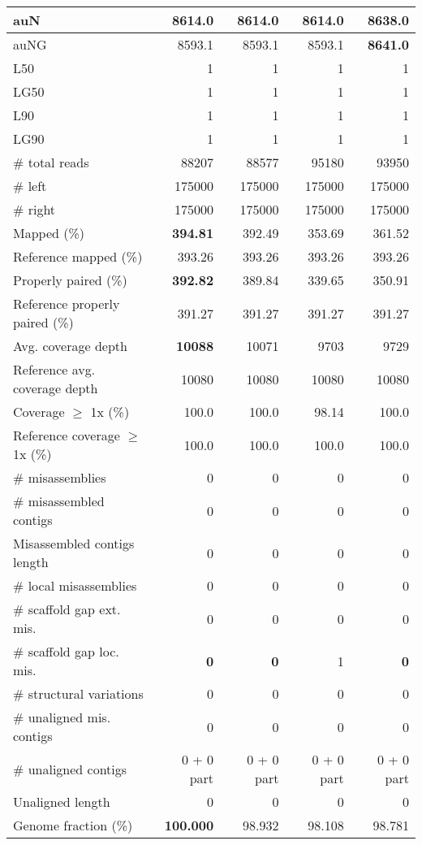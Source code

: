\documentclass[12pt,a4paper]{article}
\begin{document}
\begin{table}[ht]
\begin{center}
\begin{tabular}{|l*{4}{|r}|}
auN & 8614.0 & 8614.0 & 8614.0 & {\bf 8638.0} \\ \hline
auNG & 8593.1 & 8593.1 & 8593.1 & {\bf 8641.0} \\ \hline
L50 & 1 & 1 & 1 & 1 \\ \hline
LG50 & 1 & 1 & 1 & 1 \\ \hline
L90 & 1 & 1 & 1 & 1 \\ \hline
LG90 & 1 & 1 & 1 & 1 \\ \hline
\# total reads & 88207 & 88577 & 95180 & 93950 \\ \hline
\# left & 175000 & 175000 & 175000 & 175000 \\ \hline
\# right & 175000 & 175000 & 175000 & 175000 \\ \hline
Mapped (\%) & {\bf 394.81} & 392.49 & 353.69 & 361.52 \\ \hline
Reference mapped (\%) & 393.26 & 393.26 & 393.26 & 393.26 \\ \hline
Properly paired (\%) & {\bf 392.82} & 389.84 & 339.65 & 350.91 \\ \hline
Reference properly paired (\%) & 391.27 & 391.27 & 391.27 & 391.27 \\ \hline
Avg. coverage depth & {\bf 10088} & 10071 & 9703 & 9729 \\ \hline
Reference avg. coverage depth & 10080 & 10080 & 10080 & 10080 \\ \hline
Coverage $\geq$ 1x (\%) & 100.0 & 100.0 & 98.14 & 100.0 \\ \hline
Reference coverage $\geq$ 1x (\%) & 100.0 & 100.0 & 100.0 & 100.0 \\ \hline
\# misassemblies & 0 & 0 & 0 & 0 \\ \hline
\# misassembled contigs & 0 & 0 & 0 & 0 \\ \hline
Misassembled contigs length & 0 & 0 & 0 & 0 \\ \hline
\# local misassemblies & 0 & 0 & 0 & 0 \\ \hline
\# scaffold gap ext. mis. & 0 & 0 & 0 & 0 \\ \hline
\# scaffold gap loc. mis. & {\bf 0} & {\bf 0} & 1 & {\bf 0} \\ \hline
\# structural variations & 0 & 0 & 0 & 0 \\ \hline
\# unaligned mis. contigs & 0 & 0 & 0 & 0 \\ \hline
\# unaligned contigs & 0 + 0 part & 0 + 0 part & 0 + 0 part & 0 + 0 part \\ \hline
Unaligned length & 0 & 0 & 0 & 0 \\ \hline
Genome fraction (\%) & {\bf 100.000} & 98.932 & 98.108 & 98.781 \\ \hline

\end{tabular}
\end{center}
\end{table}
\end{document}
